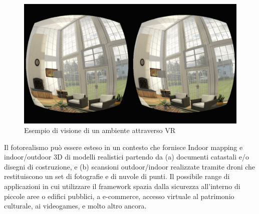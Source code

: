 \begin{figure}[htbp] %
   \centering
   \includegraphics[width=1\linewidth]{images/vr}
   \caption{Esempio di visione di un ambiente attraverso VR}
   \label{fig:revit}
   \end{figure}

Il fotorealismo può essere esteso in un contesto che fornisce Indoor mapping e indoor/outdoor 3D di modelli realistici
partendo da (a) documenti catastali e/o disegni di costruzione, e (b) scansioni outdoor/indoor realizzate tramite droni
che restituiscono un set di fotografie e di nuvole di punti.
Il possibile range di applicazioni in cui utilizzare il framework spazia dalla sicurezza all'interno di piccole aree o edifici pubblici, a e-commerce,
accesso virtuale al patrimonio culturale, ai videogames, e molto altro ancora.




\newpage
